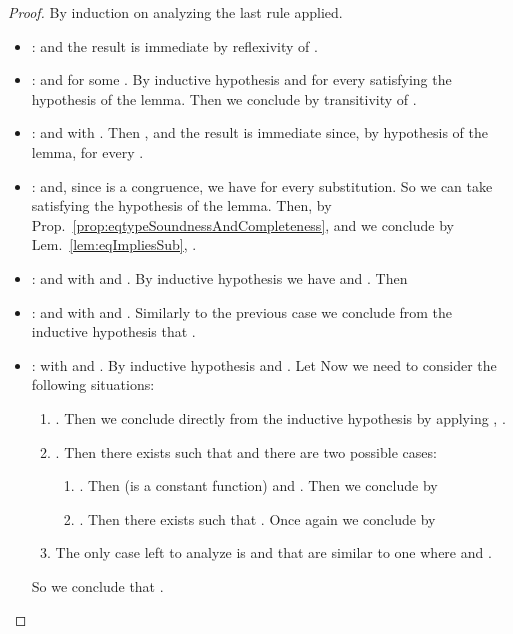 \begin{proof}
By induction on  analyzing the last rule
applied.
\begin{itemize}
  \item :  and the result is immediate by reflexivity of
  .
  
  \item :  and
   for some . By inductive
  hypothesis  and
   for every 
  satisfying the hypothesis of the lemma. Then we conclude by transitivity of
  .
  
  \item :  and  with . Then ,  and the result is
  immediate since, by hypothesis of the lemma,  for every .
  
  \item :  and, since  is a
  congruence, we have  for every
  substitution. So we can take  satisfying the hypothesis of the lemma.
  Then, by Prop.~\ref{prop:eqtypeSoundnessAndCompleteness},  and we conclude by Lem.~\ref{lem:eqImpliesSub},
  .
  
  \item :  and 
  with  and . By inductive hypothesis we have  and . Then 
  
  \item :  and 
  with  and . Similarly to the previous case we conclude from the inductive
  hypothesis that .
  
  \item :  with  and . By inductive
  hypothesis  and
  . Let 
Now we need to consider the following situations:
  \begin{enumerate}
    \item . Then we conclude directly from the inductive
    hypothesis by applying ,
    .
    
    \item . Then there exists  such that  and there are two possible cases:
    \begin{enumerate}
      \item . Then  (\ie  is a constant
      function) and . Then we conclude by
       
      
      \item . Then there exists  such that
      . Once again we conclude by
       
    \end{enumerate}
    
    \item The only case left to analyze is  and  that
    are similar to one where  and .
  \end{enumerate}
  So we conclude that .
  

\end{itemize}
\end{proof}
